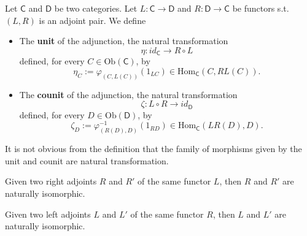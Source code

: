 \begin{defn}
	Let $\mathsf{C}$ and $\mathsf{D}$ be two categories.
	Let $L: \mathsf{C} \to \mathsf{D}$ and $R: \mathsf{D} \to \mathsf{C}$ be functors
	s.t. $\left(L, R\right)$ is an adjoint pair.
	We define
	\begin{itemize}
		\item The \textbf{unit} of the adjunction, the natural transformation
			\begin{equation}
			\eta: id_{\mathsf{C}} \to R \circ L
			\end{equation} 
			defined, for every $C \in \mathrm{Ob} \left(\mathsf{C}\right)$, by
			\begin{equation}
				\eta_C := \varphi_{(C, L(C))} \left( 1_{LC} \right) \in \mathrm{Hom}_{\mathsf{C}} \left( C, RL(C) \right)
			.\end{equation} 
		\item The \textbf{counit} of the adjunction, the natural transformation
			\begin{equation}
			\zeta: L \circ R \to id_{\mathsf{D}}
			\end{equation} 
			defined, for every $D \in \mathrm{Ob} \left(\mathsf{D}\right)$, by
			\begin{equation}
				\zeta_D := \varphi_{(R(D), D)}^{-1} \left( 1_{RD} \right) \in \mathrm{Hom}_{\mathsf{C}} \left( LR(D), D \right)
			.\end{equation} 
	\end{itemize}
\end{defn}

\begin{rem}[]
	It is not obvious from the definition that the family of morphisms given by the unit and counit
	are natural transformation.
\end{rem}

\begin{prop}
	Given two right adjoints $R$ and $R'$ of the same functor $L$,
	then $R$ and $R'$ are naturally isomorphic.
\end{prop} 

\begin{prop}
	Given two left adjoints $L$ and $L'$ of the same functor $R$,
	then $L$ and $L'$ are naturally isomorphic.
\end{prop} 


